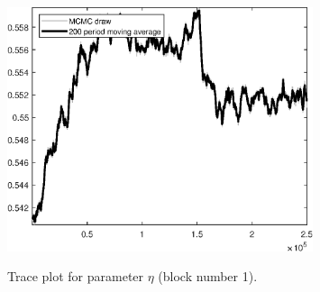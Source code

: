 \begin{figure}[H]
\centering
  \includegraphics[width=0.8\textwidth]{BRS_growth_ext_util/graphs/TracePlot_eta_blck_1}\\
    \caption{Trace plot for parameter ${\eta}$ (block number 1).}
\end{figure}
